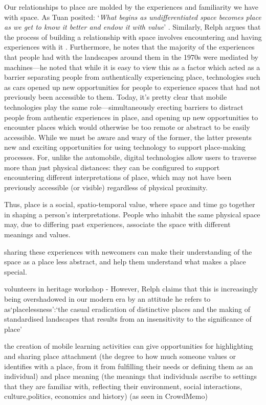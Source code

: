 Our relationships to place are molded by the experiences and familiarity we have with space. As Tuan posited: `\textit{What begins as undifferentiated space becomes place as we get to know it better and endow it with value}' \citep{Tuan1978}. Similarly, Relph argues that the process of building a relationship with space involves encountering and having experiences with it \citep{Relph1976}. Furthermore, he notes that the majority of the experiences that people had with the landscapes around them in the 1970s were mediated by machines---he noted that while it is easy to view this as a factor which acted as a barrier separating people from authentically experiencing place, technologies such as cars opened up new opportunities for people to experience spaces that had not previously been accessible to them. Today, it's pretty clear that mobile technologies play the same role---simultaneously erecting barriers to distract people from authentic experiences in place, and opening up new opportunities to encounter places which would otherwise be too remote or abstract to be easily accessible. While we must be aware and wary of the former, the latter presents new and exciting opportunities for using technology to support place-making processes. For, unlike the automobile, digital technologies allow users to traverse more than just physical distances: they can be configured to support encountering different interpretations of place, which may not have been previously accessible (or visible) regardless of physical proximity.

Thus, place is a social, spatio-temporal value, where space and time go together in shaping a person’s interpretations. People who inhabit the same physical space may, due to differing past experiences, associate the space with different meanings and values.
 
sharing these experiences with newcomers can make their understanding of the space as a place less abstract, and help them understand what makes a place special. 

volunteers in heritage workshop - However, Relph claims that this is increasingly being overshadowed in our modern era by an attitude he refers to as‘placelessness’:‘the casual eradication of distinctive places and the making of standardised landscapes that results from an insensitivity to the significance of place’

the creation of mobile learning activities can give opportunities for highlighting and sharing place attachment (the degree to how much someone values or identifies with a place, from it from fulfilling their needs or defining them as an individual) and place meaning (the meanings that individuals ascribe to settings that they are familiar with, reflecting their environment, social interactions, culture,politics, economics and history) (as seen in CrowdMemo)

